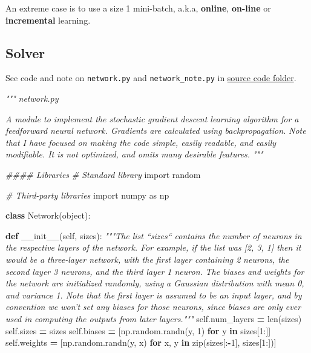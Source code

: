 \documentclass[]{book}
\newenvironment{Shaded}{\begin{snugshade}}{\end{snugshade}}
\newcommand{\KeywordTok}[1]{\textcolor[rgb]{0.13,0.29,0.53}{\textbf{{#1}}}}
\newcommand{\DecValTok}[1]{\textcolor[rgb]{0.00,0.00,0.81}{{#1}}}
\newcommand{\ImportTok}[1]{{#1}}
\newcommand{\CommentTok}[1]{\textcolor[rgb]{0.56,0.35,0.01}{\textit{{#1}}}}
\newcommand{\FunctionTok}[1]{\textcolor[rgb]{0.00,0.00,0.00}{{#1}}}
\newcommand{\VariableTok}[1]{\textcolor[rgb]{0.00,0.00,0.00}{{#1}}}
\newcommand{\ControlFlowTok}[1]{\textcolor[rgb]{0.13,0.29,0.53}{\textbf{{#1}}}}
\newcommand{\OperatorTok}[1]{\textcolor[rgb]{0.81,0.36,0.00}{\textbf{{#1}}}}
\newcommand{\BuiltInTok}[1]{{#1}}
\newcommand{\NormalTok}[1]{{#1}}
\begin{document}
An extreme case is to use a size 1 mini-batch, a.k.a, \textbf{online},
\textbf{on-line} or \textbf{incremental} learning.

\subsection{Solver}\label{solver}

See code and note on \texttt{network.py} and \texttt{network\_note.py}
in \href{./src}{source code folder}.

\begin{Shaded}
\begin{Highlighting}[]
\CommentTok{"""}
\CommentTok{network.py}
\CommentTok{~~~~~~~~~~}

\CommentTok{A module to implement the stochastic gradient descent learning algorithm for a }
\CommentTok{feedforward neural network.  Gradients are calculated using backpropagation.  }
\CommentTok{Note that I have focused on making the code simple, easily readable, and easily}
\CommentTok{modifiable.  It is not optimized, and omits many desirable features.}
\CommentTok{"""}

\CommentTok{#### Libraries}
\CommentTok{# Standard library}
\ImportTok{import} \NormalTok{random}

\CommentTok{# Third-party libraries}
\ImportTok{import} \NormalTok{numpy }\ImportTok{as} \NormalTok{np}

\KeywordTok{class} \NormalTok{Network(}\BuiltInTok{object}\NormalTok{):}

    \KeywordTok{def} \FunctionTok{__init__}\NormalTok{(}\VariableTok{self}\NormalTok{, sizes):}
        \CommentTok{"""The list ``sizes`` contains the number of neurons in the respective }
\CommentTok{        layers of the network.  For example, if the list was [2, 3, 1] then it}
\CommentTok{        would be a three-layer network, with the first layer containing 2 }
\CommentTok{        neurons, the second layer 3 neurons, and the third layer 1 neuron.  }
\CommentTok{        The biases and weights for the network are initialized randomly, using }
\CommentTok{        a Gaussian distribution with mean 0, and variance 1.  Note that the }
\CommentTok{        first layer is assumed to be an input layer, and by convention we won't }
\CommentTok{        set any biases for those neurons, since biases are only ever used in }
\CommentTok{        computing the outputs from later layers."""}
        \VariableTok{self}\NormalTok{.num_layers }\OperatorTok{=} \BuiltInTok{len}\NormalTok{(sizes)}
        \VariableTok{self}\NormalTok{.sizes }\OperatorTok{=} \NormalTok{sizes}
        \VariableTok{self}\NormalTok{.biases }\OperatorTok{=} \NormalTok{[np.random.randn(y, }\DecValTok{1}\NormalTok{) }\ControlFlowTok{for} \NormalTok{y }\OperatorTok{in} \NormalTok{sizes[}\DecValTok{1}\NormalTok{:]]}
        \VariableTok{self}\NormalTok{.weights }\OperatorTok{=} \NormalTok{[np.random.randn(y, x)}
                        \ControlFlowTok{for} \NormalTok{x, y }\OperatorTok{in} \BuiltInTok{zip}\NormalTok{(sizes[:}\OperatorTok{-}\DecValTok{1}\NormalTok{], sizes[}\DecValTok{1}\NormalTok{:])]}


\end{Highlighting}
\end{Shaded}
\end{document}
